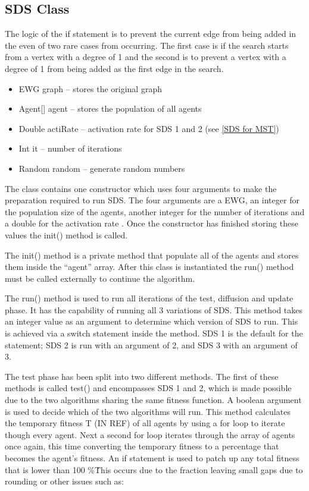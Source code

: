 \documentclass{AISB2008}
\begin{document}
{\subsection{SDS Class}

The logic of the if statement is to prevent the current edge from being added in the even of two rare cases from occurring. The first case is if the search starts from a vertex with a degree of 1 and the second is to prevent a vertex with a degree of 1 from being added as the first edge in the search.

\begin{itemize}
\item EWG graph – stores the original graph
\item Agent[] agent – stores the population of all agents
\item Double actiRate – activation rate for SDS 1 and 2 (see \ref{SDS for MST})
\item Int it – number of iterations
\item Random random – generate random numbers
\end{itemize}

The class contains one constructor which uses four arguments to make the preparation required to run SDS. The four arguments are a EWG, an integer for the population size of the agents, another integer for the number of iterations and a double for the activation rate . Once the constructor has finished storing these values the init() method is called.

The init() method is a private method that populate all of the agents and stores them inside the “agent” array. After this class is instantiated the run() method must be called externally to continue the algorithm.

The run() method is used to run all iterations of the test, diffusion and update phase. It has the capability of running all 3 variations of SDS. This method takes an integer value as an argument to determine which version of SDS to run. This is achieved via a switch statement inside the method. SDS 1 is the default for the statement; SDS 2 is run with an argument of 2, and SDS 3 with an argument of 3.

The test phase has been split into two different methods.  The first of these methods is called test() and encompasses SDS 1 and 2, which is made possible due to the two algorithms sharing the same fitness function.  A boolean argument is used to decide which of the two algorithms will run. This method calculates the temporary fitness T (IN REF) of all agents by using a for loop to iterate though every agent. Next a second for loop iterates through the array of agents once again, this time converting the temporary fitness to a percentage that becomes the agent’s fitness. An if statement is used to patch up any total fitness that is lower than 100 \%\. This occurs due to the fraction leaving small gaps due to rounding or other issues such as:

}
\end{document}
